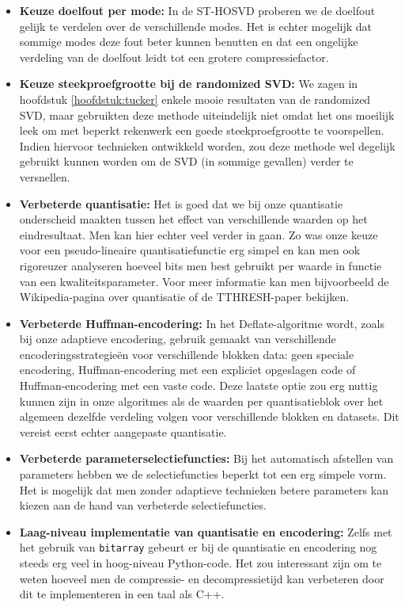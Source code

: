\begin{itemize}
\item \textbf{Keuze doelfout per mode:} In de ST-HOSVD proberen we de doelfout gelijk te verdelen over de verschillende modes. Het is echter mogelijk dat sommige modes deze fout beter kunnen benutten en dat een ongelijke verdeling van de doelfout leidt tot een grotere compressiefactor.
\item \textbf{Keuze steekproefgrootte bij de randomized SVD:} We zagen in hoofdstuk \ref{hoofdstuk:tucker} enkele mooie resultaten van de randomized SVD, maar gebruikten deze methode uiteindelijk niet omdat het ons moeilijk leek om met beperkt rekenwerk een goede steekproefgrootte te voorspellen. Indien hiervoor technieken ontwikkeld worden, zou deze methode wel degelijk gebruikt kunnen worden om de SVD (in sommige gevallen) verder te versnellen.
\item \textbf{Verbeterde quantisatie:} Het is goed dat we bij onze quantisatie onderscheid maakten tussen het effect van verschillende waarden op het eindresultaat. Men kan hier echter veel verder in gaan. Zo was onze keuze voor een pseudo-lineaire quantisatiefunctie erg simpel en kan men ook rigoreuzer analyseren hoeveel bits men best gebruikt per waarde in functie van een kwaliteitsparameter. Voor meer informatie kan men bijvoorbeeld de Wikipedia-pagina over quantisatie \cite{ref:quantization} of de TTHRESH-paper \cite{ref:tthresh} bekijken.
\item \textbf{Verbeterde Huffman-encodering:} In het Deflate-algoritme \cite{ref:deflate} wordt, zoals bij onze adaptieve encodering, gebruik gemaakt van verschillende encoderingsstrategie\"en voor verschillende blokken data: geen speciale encodering, Huffman-encodering met een expliciet opgeslagen code of Huffman-encodering met een vaste code. Deze laatste optie zou erg nuttig kunnen zijn in onze algoritmes als de waarden per quantisatieblok over het algemeen dezelfde verdeling volgen voor verschillende blokken en datasets. Dit vereist eerst echter aangepaste quantisatie.
\item \textbf{Verbeterde parameterselectiefuncties:} Bij het automatisch afstellen van parameters hebben we de selectiefuncties beperkt tot een erg simpele vorm. Het is mogelijk dat men zonder adaptieve technieken betere parameters kan kiezen aan de hand van verbeterde selectiefuncties.
\item \textbf{Laag-niveau implementatie van quantisatie en encodering:} Zelfs met het gebruik van \texttt{bitarray} \cite{ref:bitarray} gebeurt er bij de quantisatie en encodering nog steeds erg veel in hoog-niveau Python-code. Het zou interessant zijn om te weten hoeveel men de compressie- en decompressietijd kan verbeteren door dit te implementeren in een taal als C++.
\end{itemize}